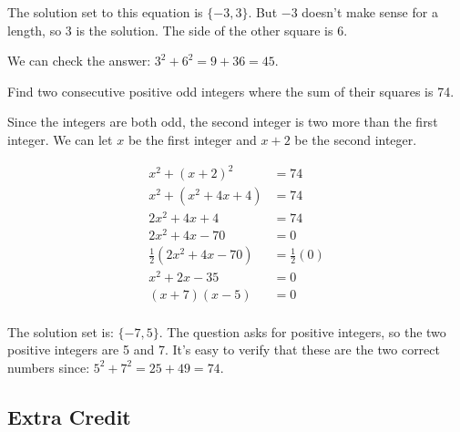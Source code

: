 \documentclass[fleqn,addpoints]{exam}
\begin{document}
\begin{questions}
\begin{solution}[7 cm]
The solution set to this equation is $\{-3, 3\}$.  But $-3$ doesn't make sense for a length, so $3$ is the solution.
The side of the other square is $6$.  

We can check the answer: $3^2 + 6^2 = 9 + 36 = 45$.

\end{solution}

\question[7]
\label{word:last}
Find two consecutive positive odd integers where the sum of their squares is 74.
\begin{solution}[7 cm]

Since the integers are both odd, the second integer is two more than the first integer.  We can let $x$ be the first
integer and $x + 2$ be the second integer.

\begin{align*}
  x^2 + (x + 2)^2 &= 74 \\
  x^2 + (x^2 + 4x + 4) &= 74 \\
  2x^2 + 4x + 4  &= 74 \\
  2x^2 + 4x - 70 &= 0 \\
  \frac{1}{2}(2x^2 + 4x - 70) &= \frac{1}{2}(0) \\
  x^2 + 2x - 35 &= 0 \\
  (x + 7)(x - 5) &= 0 \\
\end{align*}

The solution set is: $\{-7, 5\}$.  The question asks for positive integers, so the two positive integers are 5 and 7.
It's easy to verify that these are the two correct numbers since: $5^2 + 7^2 = 25 + 49 = 74$.
\end{solution}

\pagebreak

\subsection{Extra Credit}

\noaddpoints


\end{questions}
\end{document}
